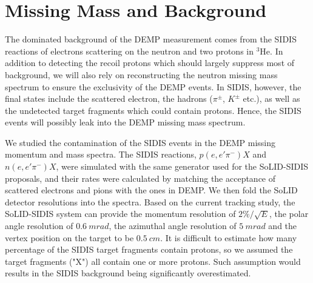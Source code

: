 \section{Missing Mass and Background}
The dominated background of the DEMP measurement comes from the SIDIS reactions of electrons scattering on the neutron and two protons in $\mathrm{^{3}He}$. In addition to detecting the recoil protons which should largely suppress most of background, we will also rely on reconstructing the neutron missing mass spectrum to ensure the exclusivity of the DEMP events. In SIDIS, however, the final states include the scattered electron, the hadrons ($\pi^{\pm}$, $K^{\pm}$ etc.), as well as the undetected target fragments which could contain protons. Hence, the SIDIS events will possibly leak into the DEMP missing mass spectrum.

We studied the contamination of the SIDIS events in the DEMP missing momentum and mass spectra. The SIDIS reactions, $p(e,e'\pi^{-})X$ and $n(e,e'\pi^{-})X$,  were simulated with the same generator used for the SoLID-SIDIS proposals, and their rates were calculated by matching the acceptance of scattered electrons and pions with the ones in DEMP. We then fold the SoLID detector resolutions into the spectra. Based on the current tracking study, the SoLID-SIDIS system can provide the momentum resolution of $2\%/\sqrt{E}$, the polar angle resolution of  $0.6~mrad$, the azimuthal angle resolution of $5~mrad$ and the vertex position on the target to be $0.5~cm$. It is difficult to estimate how many percentage of the SIDIS target fragments contain protons, so we assumed the target fragments ("X") all contain one or more protons. Such assumption would results in the SIDIS background being significantly overestimated. 

